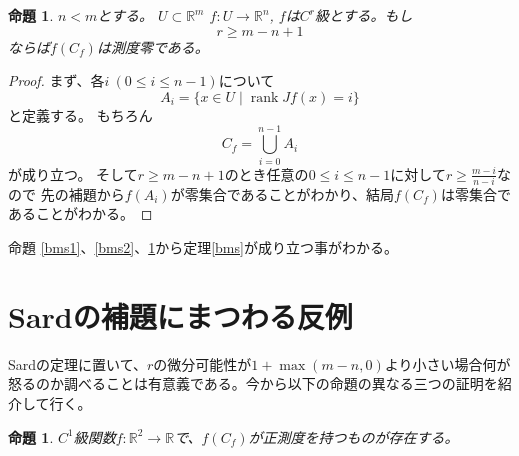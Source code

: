 \documentclass[leqno]{jsarticle}
\newtheorem{prop}[thm]{命題}
\newcommand{\rr}{\mathbb{R}}
\DeclareMathOperator{\rank}{rank}
\begin{document}
\begin{prop}\label{bms3}
$n<m$とする。
$U\subset \rr^m$
$f:U\to \rr^n$, $f$は$C^r$級とする。もし
\[
r\ge m-n+1
\]
ならば$f(C_f)$は測度零である。
\end{prop}
\begin{proof}
まず、各$i\ (0\le i\le n-1)$について
\[
A_i=\{x\in U\mid \rank Jf(x)=i\}
\]
と定義する。
もちろん
\[
C_f=\bigcup_{i=0}^{n-1}A_i
\]
が成り立つ。
そして$r\ge m-n+1$のとき任意の$0\le i\le n-1$に対して$r\ge \frac{m-i}{n-i}$なので
先の補題から$f(A_i)$が零集合であることがわかり、結局$f(C_f)$は零集合であることがわかる。
\end{proof}

命題 \ref{bms1}、\ref{bms2}、\ref{bms3}から定理\ref{bms}が成り立つ事がわかる。


\section{Sardの補題にまつわる反例}
Sardの定理に置いて、$r$の微分可能性が$1+\max(m-n,0)$より小さい場合何が怒るのか調べることは有意義である。今から以下の命題の異なる三つの証明を紹介して行く。
\begin{prop}
$C^1$級関数$f:\rr^2\to \rr$で、$f(C_f)$が正測度を持つものが存在する。
\end{prop}
\end{document}
